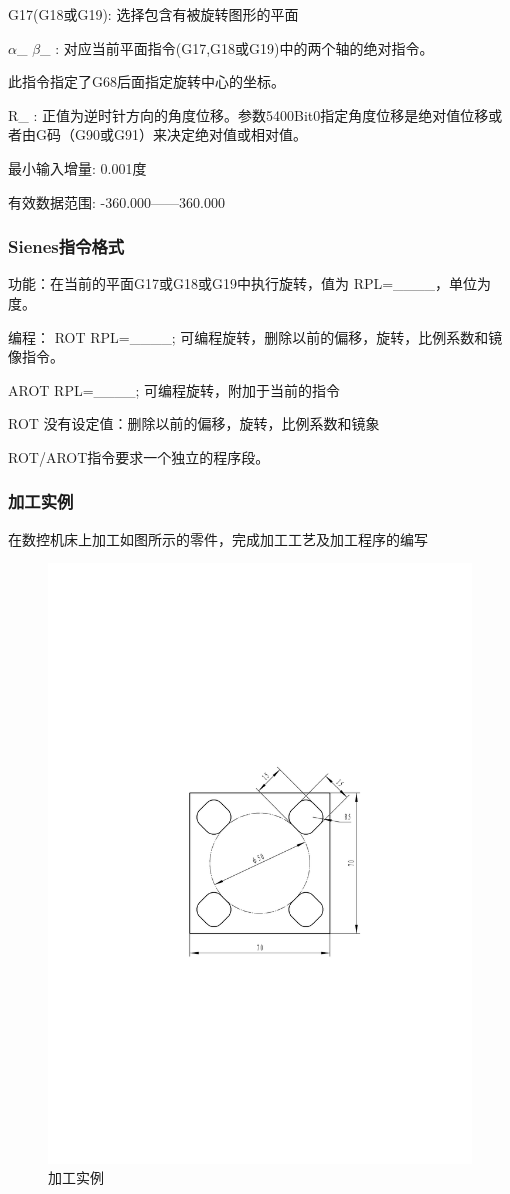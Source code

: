 G17(G18或G19): 选择包含有被旋转图形的平面

$\alpha$\_ $\beta$\_ :         对应当前平面指令(G17,G18或G19)中的两个轴的绝对指令。

此指令指定了G68后面指定旋转中心的坐标。

R\_    :         正值为逆时针方向的角度位移。参数5400Bit0指定角度位移是绝对值位移或者由G码（G90或G91）来决定绝对值或相对值。

最小输入增量: 0.001度

有效数据范围: -360.000------360.000


\subsubsection{Sienes指令格式}

功能：在当前的平面G17或G18或G19中执行旋转，值为 RPL=\_\_\_\_，单位为度。

编程：    ROT RPL=\_\_\_\_;  可编程旋转，删除以前的偏移，旋转，比例系数和镜像指令。

AROT RPL=\_\_\_\_; 可编程旋转，附加于当前的指令

ROT    没有设定值：删除以前的偏移，旋转，比例系数和镜象

ROT/AROT指令要求一个独立的程序段。

\subsubsection{加工实例}
在数控机床上加工如图所示的零件，完成加工工艺及加工程序的编写

\begin{figure}[h]
	\centering
	\includegraphics[width=0.7\linewidth,trim=0 0 0 0,clip]{data/image/32-1}
	\caption{加工实例}
	\label{fig:32-1}
\end{figure}

